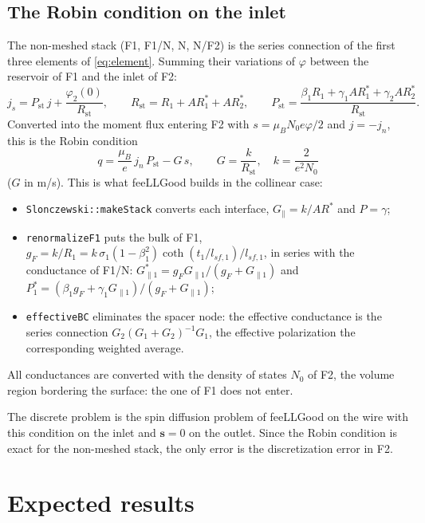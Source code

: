 \documentclass[11pt,a4paper]{article}
\newcommand{\vs}{\bm{s}}
\begin{document}
\subsection{The Robin condition on the inlet}

The non-meshed stack (F1, F1/N, N, N/F2) is the series connection of the
first three elements of \eqref{eq:element}. Summing their variations of
$\varphi$ between the reservoir of F1 and the inlet of F2:
\begin{equation}
  j_s = P_{\mathrm{st}}\,j + \frac{\varphi_2(0)}{R_{\mathrm{st}}},
  \qquad
  R_{\mathrm{st}} = R_1 + AR_1^* + AR_2^*,
  \qquad
  P_{\mathrm{st}} = \frac{\beta_1R_1 + \gamma_1AR_1^* + \gamma_2AR_2^*}{R_{\mathrm{st}}} .
\end{equation}
Converted into the moment flux entering F2 with $s = \mu_BN_0e\varphi/2$
and $j = -j_n$, this is the Robin condition
\begin{equation}
  \boxed{\;q = \frac{\mu_B}{e}\,j_n\,P_{\mathrm{st}} - G\,s,
  \qquad G = \frac{k}{R_{\mathrm{st}}},\quad k = \frac{2}{e^2N_0}\;}
\end{equation}
($G$ in m/s). This is what feeLLGood builds in the collinear case:
\begin{itemize}
  \item \texttt{Slonczewski::makeStack} converts each interface,
    $G_\parallel = k/AR^*$ and $P = \gamma$;
  \item \texttt{renormalizeF1} puts the bulk of F1,
    $g_F = k/R_1 = k\,\sigma_1(1-\beta_1^2)\coth(t_1/l_{sf,1})/l_{sf,1}$,
    in series with the conductance of F1/N:
    $G_{\parallel1}^* = g_FG_{\parallel1}/(g_F+G_{\parallel1})$ and
    $P_1^* = (\beta_1g_F + \gamma_1G_{\parallel1})/(g_F+G_{\parallel1})$;
  \item \texttt{effectiveBC} eliminates the spacer node: the effective
    conductance is the series connection $G_2(G_1+G_2)^{-1}G_1$, the
    effective polarization the corresponding weighted average.
\end{itemize}
All conductances are converted with the density of states $N_0$ of F2,
the volume region bordering the surface: the one of F1 does not enter.

The discrete problem is the spin diffusion problem of feeLLGood on the
wire with this condition on the inlet and $\vs = 0$ on the outlet. Since
the Robin condition is exact for the non-meshed stack, the only error is
the discretization error in F2.

\section{Expected results}
\end{document}
